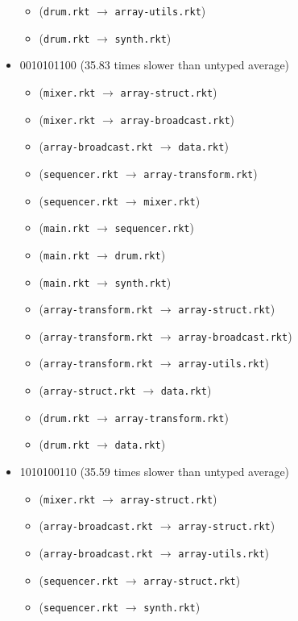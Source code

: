 \documentclass{article}
\newcommand{\mono}[1]{\texttt{#1}}
\begin{document}
\begin{itemize}
\begin{itemize}
  \item (\mono{drum.rkt} $\rightarrow$ \mono{array-utils.rkt})
  \item (\mono{drum.rkt} $\rightarrow$ \mono{synth.rkt})
  \end{itemize}
\item 0010101100 (35.83 times slower than untyped average)
  \begin{itemize}
  \item (\mono{mixer.rkt} $\rightarrow$ \mono{array-struct.rkt})
  \item (\mono{mixer.rkt} $\rightarrow$ \mono{array-broadcast.rkt})
  \item (\mono{array-broadcast.rkt} $\rightarrow$ \mono{data.rkt})
  \item (\mono{sequencer.rkt} $\rightarrow$ \mono{array-transform.rkt})
  \item (\mono{sequencer.rkt} $\rightarrow$ \mono{mixer.rkt})
  \item (\mono{main.rkt} $\rightarrow$ \mono{sequencer.rkt})
  \item (\mono{main.rkt} $\rightarrow$ \mono{drum.rkt})
  \item (\mono{main.rkt} $\rightarrow$ \mono{synth.rkt})
  \item (\mono{array-transform.rkt} $\rightarrow$ \mono{array-struct.rkt})
  \item (\mono{array-transform.rkt} $\rightarrow$ \mono{array-broadcast.rkt})
  \item (\mono{array-transform.rkt} $\rightarrow$ \mono{array-utils.rkt})
  \item (\mono{array-struct.rkt} $\rightarrow$ \mono{data.rkt})
  \item (\mono{drum.rkt} $\rightarrow$ \mono{array-transform.rkt})
  \item (\mono{drum.rkt} $\rightarrow$ \mono{data.rkt})
  \end{itemize}
\item 1010100110 (35.59 times slower than untyped average)
  \begin{itemize}
  \item (\mono{mixer.rkt} $\rightarrow$ \mono{array-struct.rkt})
  \item (\mono{array-broadcast.rkt} $\rightarrow$ \mono{array-struct.rkt})
  \item (\mono{array-broadcast.rkt} $\rightarrow$ \mono{array-utils.rkt})
  \item (\mono{sequencer.rkt} $\rightarrow$ \mono{array-struct.rkt})
  \item (\mono{sequencer.rkt} $\rightarrow$ \mono{synth.rkt})

\end{itemize}
\end{itemize}
\end{document}
